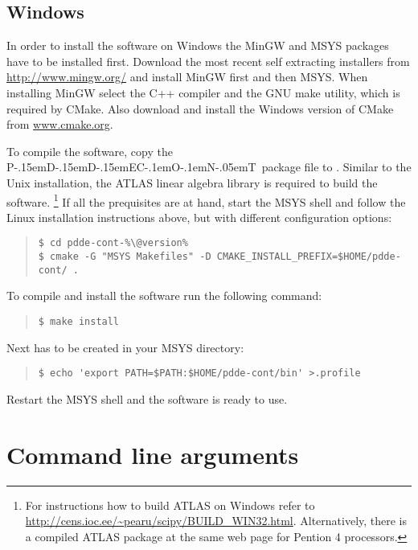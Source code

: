 \documentclass[10pt,a4paper]{ddedoc}
\def\pdde{{P\kern-.15emD\kern-.15emD\kern-.15emE\raisebox{.25ex}{-}C\kern-.1emO\kern-.1emN\kern-.05emT}}
\begin{document}
\subsection{Windows}

In order to install the software on Windows the MinGW and MSYS packages have to be installed first. Download the most recent self extracting installers from \url{http://www.mingw.org/} and install MinGW first and then MSYS. When installing MinGW select the C++ compiler and the GNU make utility, which is required by CMake. Also download and install the Windows version of CMake from \url{www.cmake.org}.

To compile the software, copy the \pdde\ package file  to . Similar to the Unix installation, the ATLAS linear algebra library is required to build the software. \footnote{For instructions how to build ATLAS on Windows refer to \url{http://cens.ioc.ee/~pearu/scipy/BUILD_WIN32.html}. Alternatively, there is a compiled ATLAS package at the same web page for Pention 4 processors.} If all the prequisites are at hand, start the MSYS shell and follow the Linux installation instructions above, but with different configuration options:
{ \small \begin{quote} \begin{lstlisting}[basicstyle=\tt,frame=single]
$ cd pdde-cont-%\@version%
$ cmake -G "MSYS Makefiles" -D CMAKE_INSTALL_PREFIX=$HOME/pdde-cont/ .
\end{lstlisting} \end{quote} } \noindent
To compile and install the software run the following command:
{ \small \begin{quote} \begin{lstlisting}[basicstyle=\tt,frame=single]
$ make install
\end{lstlisting} \end{quote} } \noindent
Next  has to be created in your MSYS  directory:
{ \small \begin{quote} \begin{lstlisting}[basicstyle=\tt,frame=single]
$ echo 'export PATH=$PATH:$HOME/pdde-cont/bin' >.profile
\end{lstlisting} \end{quote} } \noindent
Restart the MSYS shell and the software is ready to use.

\section{Command line arguments}
\end{document}
